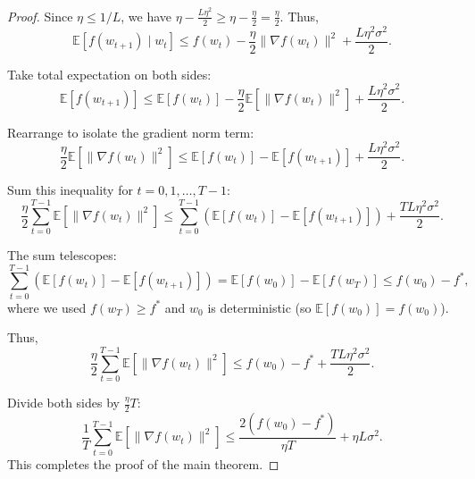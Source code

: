 \documentclass{article}
\begin{document}
\begin{proof}
Since $\eta \leq 1/L$, we have $\eta - \frac{L \eta^2}{2} \geq \eta - \frac{\eta}{2} = \frac{\eta}{2}$. Thus,
\begin{equation}
    \mathbb{E}[f(w_{t+1}) \mid w_t] \leq f(w_t) - \frac{\eta}{2} \|\nabla f(w_t)\|^2 + \frac{L \eta^2 \sigma^2}{2}. \tag{Step 9}
\end{equation}

Take total expectation on both sides:
\begin{equation}
    \mathbb{E}[f(w_{t+1})] \leq \mathbb{E}[f(w_t)] - \frac{\eta}{2} \mathbb{E}[\|\nabla f(w_t)\|^2] + \frac{L \eta^2 \sigma^2}{2}. \tag{Step 10}
\end{equation}

Rearrange to isolate the gradient norm term:
\begin{equation}
    \frac{\eta}{2} \mathbb{E}[\|\nabla f(w_t)\|^2] \leq \mathbb{E}[f(w_t)] - \mathbb{E}[f(w_{t+1})] + \frac{L \eta^2 \sigma^2}{2}. \tag{Step 11}
\end{equation}

Sum this inequality for $t = 0, 1, \dots, T-1$:
\begin{equation}
    \frac{\eta}{2} \sum_{t=0}^{T-1} \mathbb{E}[\|\nabla f(w_t)\|^2] \leq \sum_{t=0}^{T-1} \left( \mathbb{E}[f(w_t)] - \mathbb{E}[f(w_{t+1})] \right) + \frac{T L \eta^2 \sigma^2}{2}. \tag{Step 12}
\end{equation}

The sum telescopes:
\begin{equation}
    \sum_{t=0}^{T-1} \left( \mathbb{E}[f(w_t)] - \mathbb{E}[f(w_{t+1})] \right) = \mathbb{E}[f(w_0)] - \mathbb{E}[f(w_T)] \leq f(w_0) - f^*, \tag{Step 13}
\end{equation}
where we used $f(w_T) \geq f^*$ and $w_0$ is deterministic (so $\mathbb{E}[f(w_0)] = f(w_0)$).

Thus,
\begin{equation}
    \frac{\eta}{2} \sum_{t=0}^{T-1} \mathbb{E}[\|\nabla f(w_t)\|^2] \leq f(w_0) - f^* + \frac{T L \eta^2 \sigma^2}{2}. \tag{Step 14}
\end{equation}

Divide both sides by $\frac{\eta}{2} T$:
\begin{equation}
    \frac{1}{T} \sum_{t=0}^{T-1} \mathbb{E}[\|\nabla f(w_t)\|^2] \leq \frac{2(f(w_0) - f^*)}{\eta T} + \eta L \sigma^2. \tag{Step 15}
\end{equation}
This completes the proof of the main theorem.
\end{proof}
\end{document}
